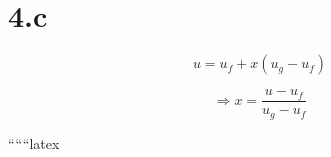 \section*{4.c}

\[
u = u_f + x (u_g - u_f)
\]

\[
\Rightarrow x = \frac{u - u_f}{u_g - u_f}
\]

``````latex